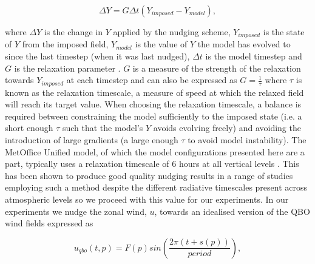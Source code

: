 \begin{equation} \label{eq:nudging}
\Delta Y = G \Delta t (Y_{imposed} - Y_{model}), 
\end{equation}

\noindent where $\Delta Y$ is the change in $Y$ applied by the nudging scheme, $Y_{imposed}$ is the state of $Y$ from the imposed field, $Y_{model}$ is the value of $Y$ the model has evolved to since the last timestep (when it was last nudged), $\Delta t$ is the model timestep and $G$ is the relaxation parameter \citep{telfordTechnical2008}. $G$ is a measure of the strength of the relaxation towards $Y_{imposed}$ at each timestep and can also be expressed as $G = \frac{1}{\tau}$ where $\tau$ is known as the relaxation timescale, a measure of speed at which the relaxed field will reach its target value. When choosing the relaxation timescale, a balance is required between constraining the model sufficiently to the imposed state (i.e. a short enough $\tau$ such that the model's $Y$ avoids evolving freely) and avoiding the introduction of large gradients (a large enough $\tau$ to avoid model instability). The MetOffice Unified model, of which the model configurations presented here are a part, typically uses a relaxation timescale of 6 hours at all vertical levels \citep{telfordTechnical2008}. This has been shown to produce good quality nudging results in a range of studies employing such a method despite the different radiative timescales present across atmospheric levels \citep{grayForecasting2020a} so we proceed with this value for our experiments. In our experiments we nudge the zonal wind, $u$, towards an idealised version of the QBO wind fields expressed as 

\begin{equation} \label{eq:imposed_U}
u_{qbo}(t, p) = F(p) sin(\frac{2\pi (t + s(p))}{period}),
\end{equation}

